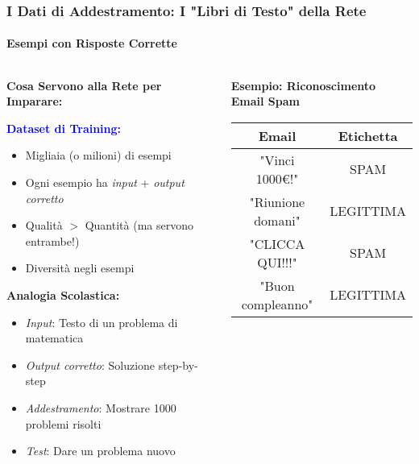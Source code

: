 \documentclass[aspectratio=169]{beamer}
\begin{document}
\begin{frame}
\frametitle{I Dati di Addestramento: I "Libri di Testo" della Rete}
\framesubtitle{Esempi con Risposte Corrette}

\begin{columns}
\begin{column}{0.6\textwidth}
\textbf{Cosa Servono alla Rete per Imparare:}

\vspace{0.3cm}
\textcolor{blue}{\textbf{Dataset di Training:}}
\begin{itemize}
    \item Migliaia (o milioni) di esempi
    \item Ogni esempio ha \textit{input} + \textit{output corretto}
    \item Qualità $>$ Quantità (ma servono entrambe!)
    \item Diversità negli esempi
\end{itemize}

\vspace{0.3cm}
\textbf{Analogia Scolastica:}
\begin{itemize}
    \item \textit{Input}: Testo di un problema di matematica
    \item \textit{Output corretto}: Soluzione step-by-step
    \item \textit{Addestramento}: Mostrare 1000 problemi risolti
    \item \textit{Test}: Dare un problema nuovo
\end{itemize}
\end{column}

\begin{column}{0.4\textwidth}
\begin{center}
\textbf{Esempio: Riconoscimento Email Spam}

\vspace{0.3cm}
\begin{tabular}{|c|c|}
\hline
\textbf{Email} & \textbf{Etichetta} \\
\hline
"Vinci 1000€!" & SPAM \\
\hline
"Riunione domani" & LEGITTIMA \\
\hline
"CLICCA QUI!!!" & SPAM \\
\hline
"Buon compleanno" & LEGITTIMA \\
\hline
\end{tabular}

\vspace{0.5cm}
\end{center}
\end{column}
\end{columns}
\end{frame}
\end{document}

